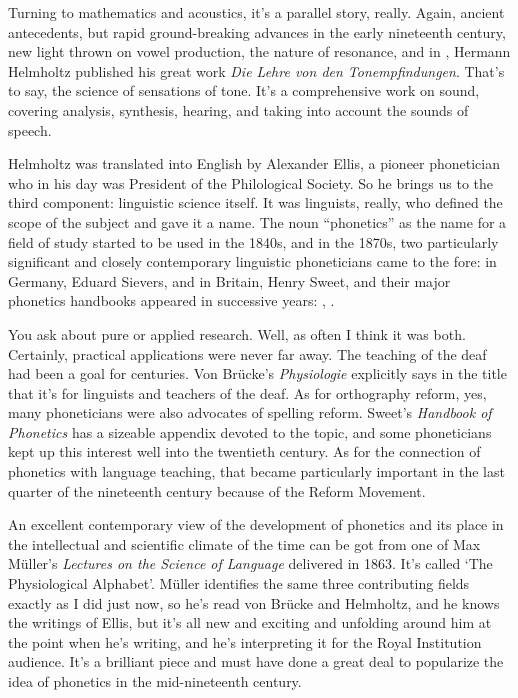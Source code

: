 \documentclass[output=paper]{langscibook}
\begin{document}
Turning to mathematics and acoustics, it’s a parallel story, really. Again, ancient antecedents, but rapid ground-breaking advances in the early nineteenth century, new light thrown on vowel production, the nature of resonance, and in \citeyear{helmholtz1863a}, Hermann Helmholtz published his great work \textit{Die Lehre von den Ton\-emp\-fin\-dungen}. That’s to say, the science of sensations of tone. It’s a comprehensive work on sound, covering analysis, synthesis, hearing, and taking into account the sounds of speech.

Helmholtz was translated into English by Alexander Ellis, a pioneer phonetician who in his day was President of the Philological Society. So he brings us to the third component: linguistic science itself. It was linguists, really, who defined the scope of the subject and gave it a name. The noun ``phonetics'' as the name for a field of study started to be used in the 1840s, and in the 1870s, two particularly significant and closely contemporary linguistic phoneticians came to the fore: in Germany, Eduard Sievers, and in Britain, Henry Sweet, and their major phonetics handbooks appeared in successive years: \citeyear{sievers1876a}, \citeyear{Sweet1877}. 

You ask about pure or applied research. Well, as often I think it was both. Certainly, practical applications were never far away. The teaching of the deaf had been a goal for centuries. Von Brücke’s \textit{Physiologie} explicitly says in the title that it’s for linguists and teachers of the deaf. As for orthography reform, yes, many phoneticians were also advocates of spelling reform. Sweet's \citeyear{Sweet1877} \textit{Handbook of Phonetics} has a sizeable appendix devoted to the topic, and some phoneticians kept up this interest well into the twentieth century. As for the connection of phonetics with language teaching, that became particularly important in the last quarter of the nineteenth century because of the Reform Movement.

An excellent contemporary view of the development of phonetics and its place in the intellectual and scientific climate of the time can be got from one of Max Müller’s \textit{Lectures on the Science of Language} delivered in 1863. It’s called ‘The Physiological Alphabet’. Müller identifies the same three contributing fields exactly as I did just now, so he’s read von Brücke and Helmholtz, and he knows the writings of Ellis, but it’s all new and exciting and unfolding around him at the point when he’s writing, and he’s interpreting it for the Royal Institution audience. It’s a brilliant piece and must have done a great deal to popularize the idea of phonetics in the mid-nineteenth century.
\end{document}
